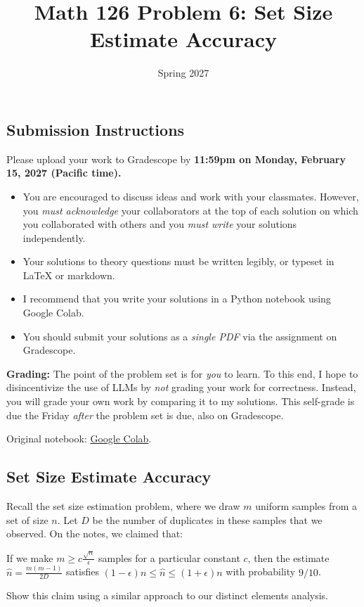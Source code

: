 \documentclass{article}
\title{Math 126 Problem 6: Set Size Estimate Accuracy}
\author{} %
\date{Spring 2027}
\begin{document}
\maketitle

\hypertarget{submission-instructions}{%
\subsection*{Submission Instructions}\label{submission-instructions}}

Please upload your work to Gradescope by \textbf{11:59pm on Monday, February 15, 2027 (Pacific time).}

\begin{itemize}
\item
  You are encouraged to discuss ideas and work with your classmates. However, you \emph{must acknowledge} your collaborators at the top of each solution on which you collaborated with others and you \emph{must write} your solutions independently.
\item
  Your solutions to theory questions must be written legibly, or typeset in LaTeX or markdown.
\item
  I recommend that you write your solutions in a Python notebook using Google Colab.
\item
  You should submit your solutions as a \emph{single PDF} via the assignment on Gradescope.
\end{itemize}

\textbf{Grading:} The point of the problem set is for \emph{you} to learn. To this end, I hope to disincentivize the use of LLMs by \emph{not} grading your work for correctness. Instead, you will grade your own work by comparing it to my solutions. This self-grade is due the Friday \emph{after} the problem set is due, also on Gradescope.

\noindent Original notebook: \href{https://colab.research.google.com/drive/1oTX14kBIP2e7m95LHlsqStddT8FTAzKY?usp=sharing}{Google Colab}.

\hypertarget{set-size-estimate-accuracy}{%
\subsection*{Set Size Estimate Accuracy}\label{set-size-estimate-accuracy}}

Recall the set size estimation problem, where we draw \(m\) uniform samples from a set of size \(n\). Let \(D\) be the number of duplicates in these samples that we observed. On the notes, we claimed that:

If we make \(m \geq c \frac{\sqrt{n}}{\epsilon}\) samples for a particular constant \(c\), then the estimate \(\widehat{n} = \frac{m(m-1)}{2D}\) satisfies \((1-\epsilon) n \leq \widehat{n} \leq (1+\epsilon) n\) with probability \(9/10\).

Show this claim using a similar approach to our distinct elements analysis.
\end{document}

